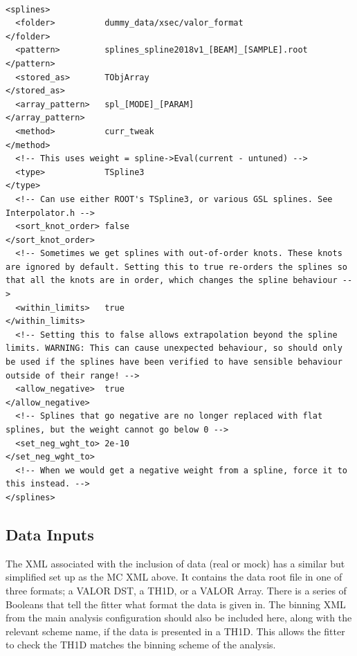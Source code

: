 {\color{capri}
\begin{verbatim}

<splines>
  <folder>          dummy_data/xsec/valor_format                  </folder>
  <pattern>         splines_spline2018v1_[BEAM]_[SAMPLE].root     </pattern>
  <stored_as>       TObjArray                                     </stored_as>
  <array_pattern>   spl_[MODE]_[PARAM]                            </array_pattern>
  <method>          curr_tweak                                    </method>           
  <!-- This uses weight = spline->Eval(current - untuned) -->
  <type>            TSpline3                                      </type>            
  <!-- Can use either ROOT's TSpline3, or various GSL splines. See Interpolator.h -->
  <sort_knot_order> false                                         </sort_knot_order> 
  <!-- Sometimes we get splines with out-of-order knots. These knots are ignored by default. Setting this to true re-orders the splines so that all the knots are in order, which changes the spline behaviour -->
  <within_limits>   true                                          </within_limits>    
  <!-- Setting this to false allows extrapolation beyond the spline limits. WARNING: This can cause unexpected behaviour, so should only be used if the splines have been verified to have sensible behaviour outside of their range! -->
  <allow_negative>  true                                          </allow_negative>   
  <!-- Splines that go negative are no longer replaced with flat splines, but the weight cannot go below 0 -->
  <set_neg_wght_to> 2e-10                                         </set_neg_wght_to>  
  <!-- When we would get a negative weight from a spline, force it to this instead. -->
</splines>

\end{verbatim}
}

\subsection{Data Inputs}
\label{sec:config/data}

The XML associated with the inclusion of data (real or mock) has a similar but simplified set up as the MC XML above. It contains the data root file in one of three formats; a VALOR DST, a TH1D, or a VALOR Array. There is a series of Booleans that tell the fitter what format the data is given in. The binning XML from the main analysis configuration should also be included here, along with the relevant scheme name, if the data is presented in a TH1D. This allows the fitter to check the TH1D matches the binning scheme of the analysis.

